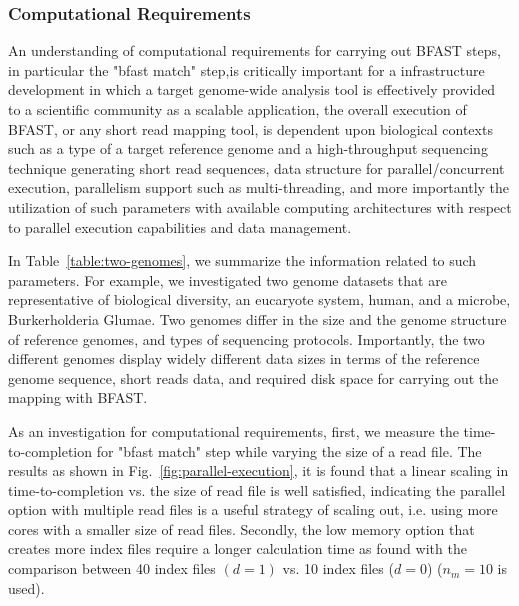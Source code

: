 \documentclass{acm_proc_article-sp}
\begin{document}
\subsubsection{Computational Requirements}

An understanding of computational requirements for carrying out BFAST steps, in particular the "bfast match" step,is 
critically important for a infrastructure development in which a target genome-wide analysis tool is effectively provided 
to a scientific community as a scalable application, the overall execution of BFAST, or any short read mapping tool, 
is dependent upon biological contexts such as a type of a target reference genome and a high-throughput sequencing 
technique generating short read sequences, data structure for parallel/concurrent execution, parallelism support such
 as multi-threading, and more importantly the utilization of such parameters with available computing architectures with 
 respect to parallel execution capabilities and data management.  

In Table~\ref{table:two-genomes}, we summarize the information related to such parameters. 
For example, we investigated two genome datasets that are representative of biological diversity, 
an eucaryote system, human, and a microbe, Burkerholderia Glumae\cite{kim2011}.  Two genomes 
differ in the size and the genome structure of reference genomes, and types of sequencing protocols.  
Importantly, the two different genomes display widely different data sizes in terms of the reference
genome sequence, short reads data, and required disk space for carrying out the mapping with BFAST. 

As an investigation for computational requirements, first, we measure the time-to-completion for "bfast match"
 step while varying the size of a read file.  The results as shown in Fig.~\ref{fig:parallel-execution}, it is found
  that a linear scaling in time-to-completion vs. the size of read file is well satisfied, indicating the parallel option 
  with multiple read files is a useful strategy of scaling out, i.e.  using more cores with a smaller size of read files.  
  Secondly, the low memory option that creates more index files require a longer calculation time as found 
  with the comparison between 40 index files $(d = 1)$ vs. 10 index files ($ d = 0 $) ($n_m = 10$ is used).   


\end{document}
